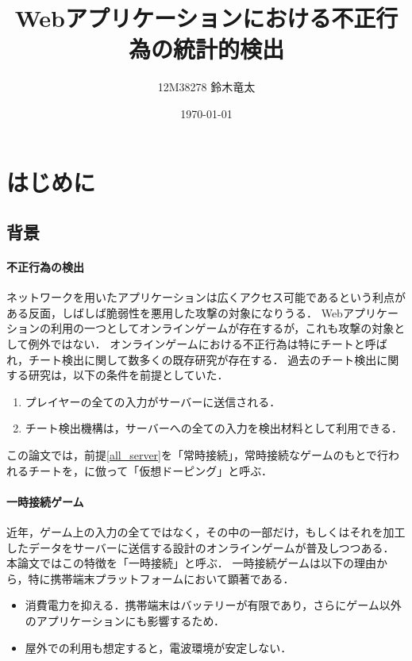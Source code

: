 \documentclass[a4paper,11pt]{jsarticle}
\title{Webアプリケーションにおける不正行為の統計的検出}
\author{12M38278 鈴木竜太}
\date{\today}
\begin{document}

\section{はじめに}
\subsection{背景}
\paragraph{不正行為の検出}
ネットワークを用いたアプリケーションは広くアクセス可能であるという利点がある反面，しばしば脆弱性を悪用した攻撃の対象になりうる．
Webアプリケーションの利用の一つとしてオンラインゲームが存在するが，これも攻撃の対象として例外ではない．
オンラインゲームにおける不正行為は特にチートと呼ばれ，チート検出に関して数多くの既存研究が存在する．
過去のチート検出に関する研究は，以下の条件を前提としていた．

\begin{enumerate}
\item
\label{all_server}プレイヤーの全ての入力がサーバーに送信される．
\item
チート検出機構は，サーバーへの全ての入力を検出材料として利用できる．
\end{enumerate}

この論文では，前提\ref{all_server}を「常時接続」，常時接続なゲームのもとで行われるチートを，\cite{gamefps}に倣って「仮想ドーピング」と呼ぶ．

\paragraph{一時接続ゲーム}
近年，ゲーム上の入力の全てではなく，その中の一部だけ，もしくはそれを加工したデータをサーバーに送信する設計のオンラインゲームが普及しつつある．
本論文ではこの特徴を「一時接続」と呼ぶ．
一時接続ゲームは以下の理由から，特に携帯端末プラットフォームにおいて顕著である．

\begin{itemize}
\item
消費電力を抑える．携帯端末はバッテリーが有限であり，さらにゲーム以外のアプリケーションにも影響するため．
\item
屋外での利用も想定すると，電波環境が安定しない．
\end{itemize}
\end{document}
